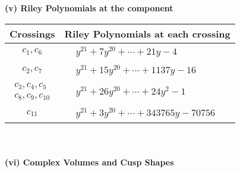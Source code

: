 \documentclass[1p]{elsarticle_modified}
\theoremstyle{definition}
\begin{document}
\newpage\renewcommand{\arraystretch}{1}
\flushleft \textbf{(v) Riley Polynomials at the component}\newline \\
\begin{tabular}{m{50pt}|m{274pt}}
Crossings & \hspace{64pt}Riley Polynomials at each crossing \\
\hline $$\begin{aligned}c_{1},c_{6}\end{aligned}$$&$\begin{aligned}
&y^{21}+7 y^{20}+\cdots+21 y-4
\end{aligned}$\\
\hline $$\begin{aligned}c_{2},c_{7}\end{aligned}$$&$\begin{aligned}
&y^{21}+15 y^{20}+\cdots+1137 y-16
\end{aligned}$\\
\hline $$\begin{aligned}c_{3},c_{4},c_{5}\\c_{8},c_{9},c_{10}\end{aligned}$$&$\begin{aligned}
&y^{21}+26 y^{20}+\cdots+24 y^2-1
\end{aligned}$\\
\hline $$\begin{aligned}c_{11}\end{aligned}$$&$\begin{aligned}
&y^{21}+3 y^{20}+\cdots+343765 y-70756
\end{aligned}$\\
\hline
\end{tabular}\\~\\
\newpage\flushleft \textbf{(vi) Complex Volumes and Cusp Shapes}
\end{document}
